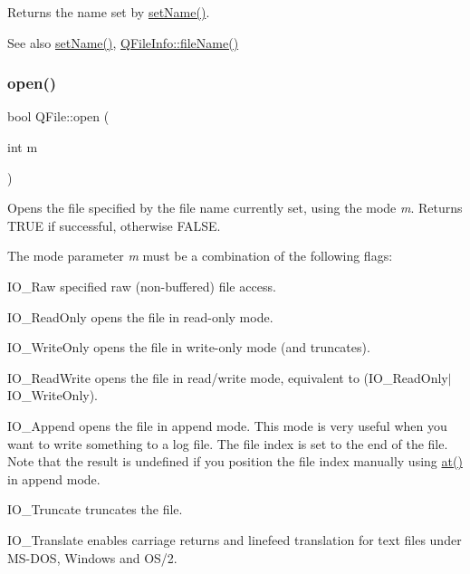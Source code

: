 Returns the name set by \mbox{\hyperlink{class_q_file_aedc2f51f8c46021cfb4ae82bae0e3b2d}{set\+Name()}}. \begin{DoxySeeAlso}{See also}
\mbox{\hyperlink{class_q_file_aedc2f51f8c46021cfb4ae82bae0e3b2d}{set\+Name()}}, \mbox{\hyperlink{class_q_file_info_a4f6795e14c6dc89e4a54d7b5cad9d03f}{Q\+File\+Info\+::file\+Name()}} 
\end{DoxySeeAlso}
\mbox{\label{class_q_file_af10aeafc303904f98b74be9752d2aa43}} 
\subsubsection{\texorpdfstring{open()}{open()}\hspace{0.1cm}{\footnotesize\ttfamily [1/3]}}
{\footnotesize\ttfamily bool Q\+File\+::open (\begin{DoxyParamCaption}\item[{int}]{m }\end{DoxyParamCaption})\hspace{0.3cm}{\ttfamily [virtual]}}

Opens the file specified by the file name currently set, using the mode {\itshape m}. Returns T\+R\+UE if successful, otherwise F\+A\+L\+SE.

The mode parameter {\itshape m} must be a combination of the following flags\+: 
\begin{DoxyItemize}
\item {\ttfamily I\+O\+\_\+\+Raw} specified raw (non-\/buffered) file access. 
\item {\ttfamily I\+O\+\_\+\+Read\+Only} opens the file in read-\/only mode. 
\item {\ttfamily I\+O\+\_\+\+Write\+Only} opens the file in write-\/only mode (and truncates). 
\item {\ttfamily I\+O\+\_\+\+Read\+Write} opens the file in read/write mode, equivalent to {\ttfamily }(I\+O\+\_\+\+Read\+Only$\vert$\+I\+O\+\_\+\+Write\+Only). 
\item {\ttfamily I\+O\+\_\+\+Append} opens the file in append mode. This mode is very useful when you want to write something to a log file. The file index is set to the end of the file. Note that the result is undefined if you position the file index manually using \mbox{\hyperlink{class_q_file_aa156f3896b35b0c6f6e9cf9237bf34bf}{at()}} in append mode. 
\item {\ttfamily I\+O\+\_\+\+Truncate} truncates the file. 
\item {\ttfamily I\+O\+\_\+\+Translate} enables carriage returns and linefeed translation for text files under M\+S-\/\+D\+OS, Windows and O\+S/2. 
\end{DoxyItemize}


